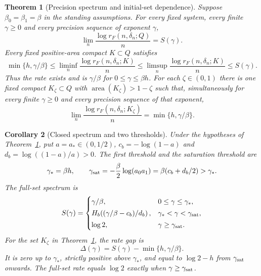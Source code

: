 \documentclass[11pt]{amsart}
\newtheorem{theorem}{Theorem}[section]
\newtheorem{corollary}[theorem]{Corollary}
\theoremstyle{definition}
\theoremstyle{remark}
\newcommand{\area}{\operatorname{area}}
\numberwithin{equation}{section}
\begin{document}
\begin{theorem}[Precision spectrum and initial-set dependence]\label{thm:main}
Suppose $\beta_0=\beta_1=\beta$ in the standing assumptions.
For every fixed system,
every finite $\gamma\ge0$ and every precision sequence of exponent
$\gamma$,
\begin{equation}\label{eq:spectrum}
\lim_n\frac{\log r_F(n,\delta_n;Q)}n=S(\gamma).
\end{equation}
Every fixed positive-area compact $K\subset Q$ satisfies
\begin{equation}\label{eq:universal}
\min\{h,\gamma/\beta\}\le
\liminf_n\frac{\log r_F(n,\delta_n;K)}n\le
\limsup_n\frac{\log r_F(n,\delta_n;K)}n\le
S(\gamma).
\end{equation}
Thus the rate exists and is $\gamma/\beta$ for $0\le\gamma\le\beta h$.
For each $\zeta\in(0,1)$ there is one fixed compact
$K_\zeta\subset Q$ with $\area(K_\zeta)>1-\zeta$ such that,
simultaneously for every finite $\gamma\ge0$ and every precision
sequence of that exponent,
\begin{equation}\label{eq:high}
\lim_n\frac{\log r_F(n,\delta_n;K_\zeta)}n
                         =\min\{h,\gamma/\beta\}.
\end{equation}
\end{theorem}

\begin{corollary}[Closed spectrum and two thresholds]\label{cor:thresholds}
Under the hypotheses of Theorem~\ref{thm:main}, put
$a=a_*\in(0,1/2)$,
$c_b=-\log(1-a)$ and $d_b=\log((1-a)/a)>0$.
The first threshold and the saturation threshold are
\begin{equation}\label{eq:thresholds}
\gamma_*=\beta h,\qquad
\gamma_{\rm sat}=-\frac\beta2\log(a_0a_1)
                  =\beta(c_b+d_b/2)>\gamma_*.
\end{equation}
The full-set spectrum is
\begin{equation}\label{eq:closed}
S(\gamma)=
\begin{cases}
\gamma/\beta,&0\le\gamma\le\gamma_*,\\[2pt]
H_b\!\left((\gamma/\beta-c_b)/d_b\right),
      &\gamma_*<\gamma<\gamma_{\rm sat},\\[2pt]
\log2,&\gamma\ge\gamma_{\rm sat}.
\end{cases}
\end{equation}
For the set $K_\zeta$ in Theorem~\ref{thm:main}, the rate gap is
\begin{equation}\label{eq:gap}
\Delta(\gamma)=S(\gamma)-\min\{h,\gamma/\beta\}.
\end{equation}
It is zero up to $\gamma_*$, strictly positive above $\gamma_*$,
and equal to $\log2-h$ from $\gamma_{\rm sat}$ onwards.
The full-set rate equals $\log2$ exactly when
$\gamma\ge\gamma_{\rm sat}$.
\end{corollary}
\end{document}
